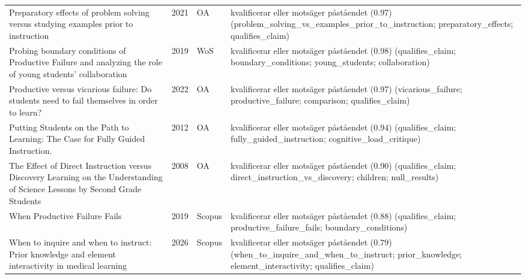 \begin{longtable}{@{}%
  >{\raggedright\arraybackslash}p{}c%
  >{\raggedright\arraybackslash}p{}%
  >{\raggedright\arraybackslash\footnotesize}p{}@{}}
Preparatory effects of problem solving versus studying examples prior to instruction & 2021 & OA & kvalificerar eller motsäger påståendet (0.97) (problem\_\allowbreak{}solving\_\allowbreak{}vs\_\allowbreak{}examples\_\allowbreak{}prior\_\allowbreak{}to\_\allowbreak{}instruction; preparatory\_\allowbreak{}effects; qualifies\_\allowbreak{}claim) \\
Probing boundary conditions of Productive Failure and analyzing the role of young students' collaboration & 2019 & WoS & kvalificerar eller motsäger påståendet (0.98) (qualifies\_\allowbreak{}claim; boundary\_\allowbreak{}conditions; young\_\allowbreak{}students; collaboration) \\
Productive versus vicarious failure: Do students need to fail themselves in order to learn? & 2022 & OA & kvalificerar eller motsäger påståendet (0.97) (vicarious\_\allowbreak{}failure; productive\_\allowbreak{}failure; comparison; qualifies\_\allowbreak{}claim) \\
Putting Students on the Path to Learning: The Case for Fully Guided Instruction. & 2012 & OA & kvalificerar eller motsäger påståendet (0.94) (qualifies\_\allowbreak{}claim; fully\_\allowbreak{}guided\_\allowbreak{}instruction; cognitive\_\allowbreak{}load\_\allowbreak{}critique) \\
The Effect of Direct Instruction versus Discovery Learning on the Understanding of Science Lessons by Second Grade Students & 2008 & OA & kvalificerar eller motsäger påståendet (0.90) (qualifies\_\allowbreak{}claim; direct\_\allowbreak{}instruction\_\allowbreak{}vs\_\allowbreak{}discovery; children; null\_\allowbreak{}results) \\
When Productive Failure Fails & 2019 & Scopus & kvalificerar eller motsäger påståendet (0.88) (qualifies\_\allowbreak{}claim; productive\_\allowbreak{}failure\_\allowbreak{}fails; boundary\_\allowbreak{}conditions) \\
When to inquire and when to instruct: Prior knowledge and element interactivity in medical learning & 2026 & Scopus & kvalificerar eller motsäger påståendet (0.79) (when\_\allowbreak{}to\_\allowbreak{}inquire\_\allowbreak{}and\_\allowbreak{}when\_\allowbreak{}to\_\allowbreak{}instruct; prior\_\allowbreak{}knowledge; element\_\allowbreak{}interactivity; qualifies\_\allowbreak{}claim) \\
\end{longtable}
\endgroup
